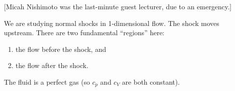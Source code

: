 
\lecture{}

[Micah Nishimoto was the last-minute guest lecturer, due to an emergency.]


\begin{recall}
We are studying normal shocks in 1-dimensional flow. The shock moves
upstream. There are two fundamental ``regions'' here:
\begin{enumerate}
\item the flow before the shock, and
\item the flow after the shock.
\end{enumerate}
\end{recall}

\begin{assume}
The fluid is a perfect gas (so $c_{p}$ and $c_{V}$ are both constant).
\end{assume}

